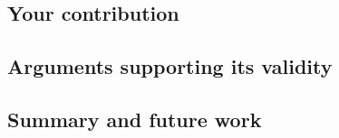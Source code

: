 \subsection*{Your contribution}


\subsection*{Arguments supporting its validity}


\subsection*{Summary and future work}

